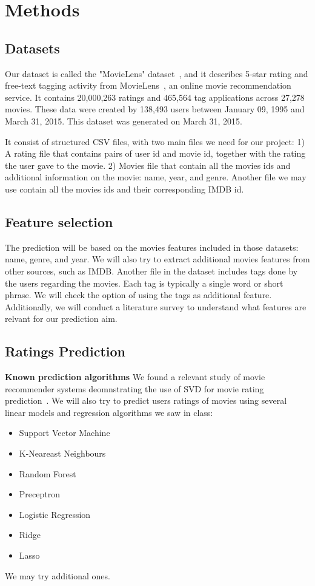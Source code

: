 \section{Methods}
\label{sec:methods}


\subsection{Datasets}
Our dataset is called the "MovieLens" dataset~\cite{GroupLens}, and it describes 5-star rating and free-text tagging activity from MovieLens~\cite{MovieLens}, an online movie recommendation service. It contains 20,000,263 ratings and 465,564 tag applications across 27,278 movies. These data were created by 138,493 users between January 09, 1995 and March 31, 2015. This dataset was generated on March 31, 2015.

It consist of structured CSV files, with two main files we need for our project: 1) A rating file that contains pairs of user id and movie id, together with the rating the user gave to the movie. 2) Movies file that contain all the movies ids and additional information on the movie: name, year, and genre. Another file we may use contain all the movies ids and their corresponding IMDB id.

\subsection{Feature selection}
The prediction will be based on the movies features included in those datasets: name, genre, and year. We will also try to extract additional movies features from other sources, such as IMDB. Another file in the dataset includes tags done by the users regarding the movies. Each tag is typically a single word or short phrase. We will check the option of using the tags as additional feature.
Additionally, we will conduct a literature survey to understand what features are relvant for our prediction aim.

\subsection{Ratings Prediction}
\textbf{Known prediction algorithms}
We found a relevant study of movie recommender systems deomnstrating the use of SVD for movie rating prediction~\cite{Ekstrand:2011:RRR:2043932.2043958}.
We will also try to predict users ratings of movies using several linear models and regression algorithms we saw in class:
\begin{itemize}
\item Support Vector Machine
\item K-Neareast Neighbours
\item Random Forest
\item Preceptron
\item Logistic Regression
\item Ridge
\item Lasso
\end{itemize}
We may try additional ones.

